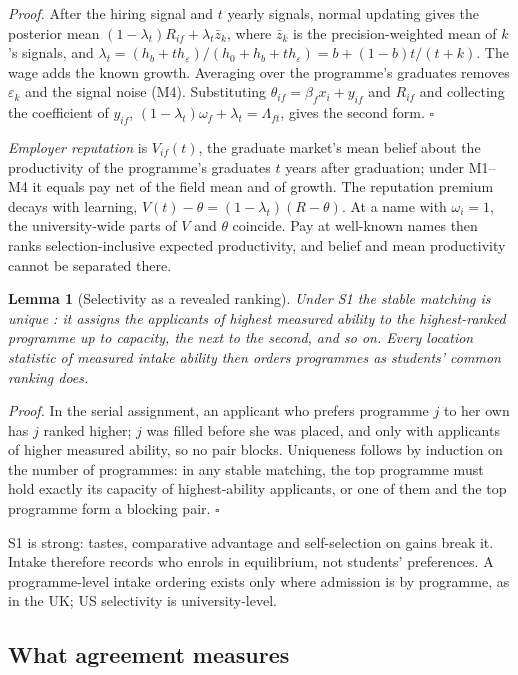 \documentclass[11pt]{article}
\newtheorem{slemma}{Lemma}
\newcommand{\qedsq}{\hfill$\square$}
\begin{document}
\emph{Proof.} After the hiring signal and $t$ yearly signals, normal updating gives the posterior mean
$(1-\lambda_t)R_{if}+\lambda_t\bar z_k$, where $\bar z_k$ is the precision-weighted mean of $k$'s signals, and
$\lambda_t=(h_b+th_\varepsilon)/(h_0+h_b+th_\varepsilon)=b+(1-b)t/(t+k)$. The wage adds the known growth. Averaging
over the programme's graduates removes $\varepsilon_k$ and the signal noise (M4). Substituting
$\theta_{if}=\beta_fx_i+y_{if}$ and $R_{if}$ and collecting the coefficient of $y_{if}$,
$(1-\lambda_t)\omega_f+\lambda_t=\Lambda_{ft}$, gives the second form. \qedsq

\emph{Employer reputation} is $V_{if}(t)$, the graduate market's mean belief about the productivity of the
programme's graduates $t$ years after graduation; under M1--M4 it equals pay net of the field mean and of growth.
The reputation premium decays with learning, $V(t)-\theta=(1-\lambda_t)(R-\theta)$. At a name with $\omega_i=1$,
the university-wide parts of $V$ and $\theta$ coincide. Pay at well-known names then ranks selection-inclusive
expected productivity, and belief and mean productivity cannot be separated there.

\begin{slemma}[Selectivity as a revealed ranking]\label{lem:students}
Under S1 the stable matching is unique \citep{gale1962college}: it assigns the applicants of highest measured
ability to the highest-ranked programme up to capacity, the next to the second, and so on. Every location statistic
of measured intake ability then orders programmes as students' common ranking does.
\end{slemma}

\emph{Proof.} In the serial assignment, an applicant who prefers programme $j$ to her own has $j$ ranked higher;
$j$ was filled before she was placed, and only with applicants of higher measured ability, so no pair blocks.
Uniqueness follows by induction on the number of programmes: in any stable matching, the top programme must hold
exactly its capacity of highest-ability applicants, or one of them and the top programme form a blocking pair.
\qedsq

S1 is strong: tastes, comparative advantage and self-selection on gains \citep{kirkeboen2016field} break it. Intake
therefore records who enrols in equilibrium, not students' preferences. A programme-level intake ordering exists
only where admission is by programme, as in the UK; US selectivity is university-level.

\subsection{What agreement measures}
\end{document}
